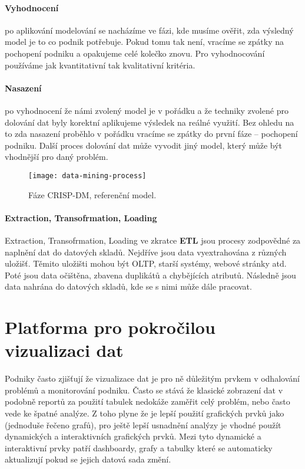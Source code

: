 \paragraph{Vyhodnocení} po aplikování modelování se nacházíme ve fázi, kde musíme ověřit, zda výsledný model je to co podnik potřebuje. Pokud tomu tak není, vracíme se zpátky na pochopení podniku a opakujeme celé kolečko znovu. Pro vyhodnocování používáme jak kvantitativní tak kvalitativní kritéria. \cite{data-mining-practical}

\paragraph{Nasazení} po vyhodnocení že námi zvolený model je v pořádku a že techniky zvolené pro dolování dat byly korektní aplikujeme výsledek na reálné využití. Bez ohledu na to zda nasazení proběhlo v pořádku vracíme se zpátky do první fáze -- pochopení podniku. Další proces dolování dat může vyvodit jiný model, který může být vhodnější pro daný problém. \cite{data-mining-practical}
\begin{figure}[!htp]
\centering
\texttt{[image: data-mining-process]}
\caption{Fáze CRISP-DM, referenční model.}
\label{crisp-dm}
\end{figure}

\paragraph{Extraction, Transofrmation, Loading}
\par Extraction, Transofrmation, Loading ve zkratce \textbf{ETL} jsou procesy zodpovědné za naplnění dat do datových skladů. Nejdříve jsou data vyextrahována z různých uložišť. Těmito uložišti mohou být OLTP, starší systémy, webové stránky atd. Poté jsou data očištěna, zbavena duplikátů a chybějících atributů. Následně jsou data nahrána do datových skladů, kde se s nimi může dále pracovat.


\section{Platforma pro pokročilou vizualizaci dat}
\par Podniky často zjišťují že vizualizace dat je pro ně důležitým prvkem v odhalování problémů a monitorování podniku. Často se stává že klasické zobrazení dat v podobně reportů za použití tabulek nedokáže zaměřit celý problém, nebo často vede ke špatné analýze. Z toho plyne že je lepší použití grafických prvků jako (jednoduše řečeno grafů), pro ještě lepší usnadnění analýzy je vhodné použít dynamických a interaktivních grafických prvků. Mezi tyto dynamické a interaktivní prvky patří dashboardy, grafy a tabulky které se automaticky aktualizují pokud se jejich datová sada změní.

